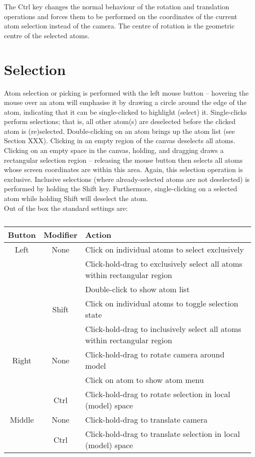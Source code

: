 The Ctrl key changes the normal behaviour of the rotation and translation operations and forces them to be performed on the coordinates of the current atom selection instead of the camera. The centre of rotation is the geometric centre of the selected atoms.

\section{Selection}
Atom selection or picking is performed with the left mouse button -- hovering the mouse over an atom will emphasise it by drawing a circle around the edge of the atom, indicating that it can be single-clicked to highlight (select) it. Single-clicks perform  selections; that is, all other atom(s) are deselected before the clicked atom is (re)selected. Double-clicking on an atom brings up the atom list (see Section XXX). Clicking in an empty region of the canvas deselects all atoms. Clicking on an empty space in the canvas, holding, and dragging draws a rectangular selection region -- releasing the mouse button then selects all atoms whose screen coordinates are within this area. Again, this selection operation is exclusive. Inclusive selections (where already-selected atoms are not deselected) is performed by holding the Shift key. Furthermore, single-clicking on a selected atom while holding Shift will deselect the atom.\\


Out of the box the standard settings are:\\

\begin{table}[h!]
  \caption{}
  \begin{tabular}{cc|l}
\hline
	Button	& Modifier	& Action \\
\hline
	Left	& None		& Click on individual atoms to select exclusively \\
		&		& Click-hold-drag to exclusively select all atoms within rectangular region \\
		&		& Double-click to show atom list \\
		& Shift		& Click on individual atoms to toggle selection state \\
		&		& Click-hold-drag to inclusively select all atoms within rectangular region \\
\hline
	Right	& None		& Click-hold-drag to rotate camera around model \\
		&		& Click on atom to show atom menu \\
		& Ctrl		& Click-hold-drag to rotate selection in local (model) space \\
\hline
	Middle	& None		& Click-hold-drag to translate camera \\
		& Ctrl		& Click-hold-drag to translate selection in local (model) space \\
  \end{tabular}
\end{table}



